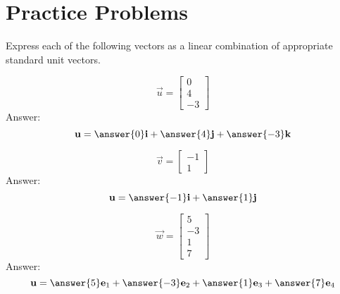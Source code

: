 \documentclass{ximera}
\begin{document}
\section*{Practice Problems}
\begin{problem}%
Express each of the following vectors as a linear combination of appropriate standard unit vectors.
  \begin{problem}\label{prob:lincombijk1a}
  $$\vec{u}=\begin{bmatrix}
0\\
4\\
-3
\end{bmatrix}$$
Answer:
$$\vec{u}=\answer{0}\vec{i}+\answer{4}\vec{j}+\answer{-3}\vec{k}$$
\end{problem}
\begin{problem}\label{prob:lincombijk1b}
$$\vec{v}=\begin{bmatrix}
-1\\
1
\end{bmatrix}$$
Answer:
$$\vec{u}=\answer{-1}\vec{i}+\answer{1}\vec{j}$$
\end{problem}
\begin{problem}\label{prob:lincombijk1c}
$$\vec{w}=\begin{bmatrix}
5\\
-3\\
1\\
7
\end{bmatrix}$$
Answer:
$$\vec{u}=\answer{5}\vec{e}_1+\answer{-3}\vec{e}_2+\answer{1}\vec{e}_3+\answer{7}\vec{e}_4$$
  \end{problem}
\end{problem}
\end{document}
